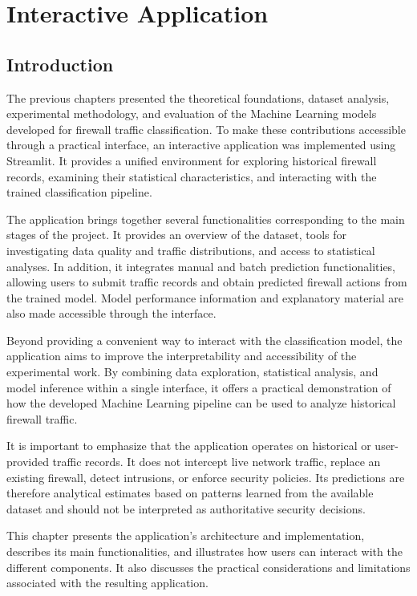 \chapter{Interactive Application}\label{chap:application}

\section{Introduction}

The previous chapters presented the theoretical foundations, dataset analysis, experimental methodology, and evaluation of the Machine Learning models developed for firewall traffic classification. To make these contributions accessible through a practical interface, an interactive application was implemented using Streamlit. It provides a unified environment for exploring historical firewall records, examining their statistical characteristics, and interacting with the trained classification pipeline.

The application brings together several functionalities corresponding to the main stages of the project. It provides an overview of the dataset, tools for investigating data quality and traffic distributions, and access to statistical analyses. In addition, it integrates manual and batch prediction functionalities, allowing users to submit traffic records and obtain predicted firewall actions from the trained model. Model performance information and explanatory material are also made accessible through the interface.

Beyond providing a convenient way to interact with the classification model, the application aims to improve the interpretability and accessibility of the experimental work. By combining data exploration, statistical analysis, and model inference within a single interface, it offers a practical demonstration of how the developed Machine Learning pipeline can be used to analyze historical firewall traffic.

It is important to emphasize that the application operates on historical or user-provided traffic records. It does not intercept live network traffic, replace an existing firewall, detect intrusions, or enforce security policies. Its predictions are therefore analytical estimates based on patterns learned from the available dataset and should not be interpreted as authoritative security decisions.

This chapter presents the application's architecture and implementation, describes its main functionalities, and illustrates how users can interact with the different components. It also discusses the practical considerations and limitations associated with the resulting application.


